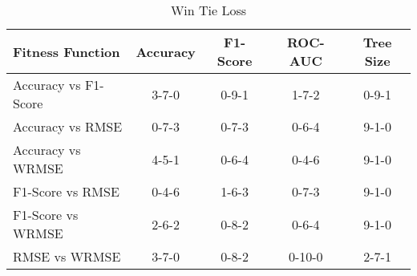 
    \begin{table}[h]
        \centering
        \renewcommand{\arraystretch}{1.2}
    \begin{tabular}{lcccc}
\toprule
Fitness Function & Accuracy & F1-Score & ROC-AUC & Tree Size \\
\midrule
Accuracy vs F1-Score & 3-7-0 & 0-9-1 & 1-7-2 & 0-9-1 \\
Accuracy vs RMSE & 0-7-3 & 0-7-3 & 0-6-4 & 9-1-0 \\
Accuracy vs WRMSE & 4-5-1 & 0-6-4 & 0-4-6 & 9-1-0 \\
F1-Score vs RMSE & 0-4-6 & 1-6-3 & 0-7-3 & 9-1-0 \\
F1-Score vs WRMSE & 2-6-2 & 0-8-2 & 0-6-4 & 9-1-0 \\
RMSE vs WRMSE & 3-7-0 & 0-8-2 & 0-10-0 & 2-7-1 \\
\bottomrule
\end{tabular}

        \caption{Win Tie Loss}
        \label{tab:fitness_wtl}
    \end{table}
    